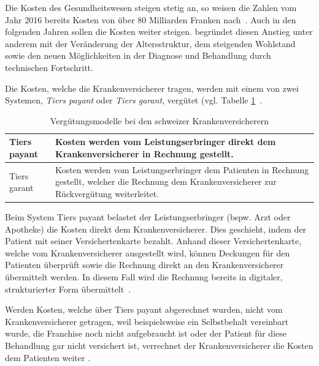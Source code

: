 Die Kosten des Gesundheitswesen steigen stetig an, so weisen die Zahlen vom Jahr 2016 bereits Kosten von über 80 Milliarden Franken nach~\autocite{BfS2018}. Auch in den folgenden Jahren sollen die Kosten weiter steigen. \textcite{Kirchgassner2009} begründet diesen Anstieg unter anderem mit der Veränderung der Altersstruktur, dem steigenden Wohlstand sowie den neuen Möglichkeiten in der Diagnose und Behandlung durch technischen Fortschritt.

Die Kosten, welche die Krankenversicherer tragen, werden mit einem von zwei Systemen, \textit{Tiers payant} oder \textit{Tiers garant}, vergütet (vgl. Tabelle \ref{tiers}~\autocite{EDI2017}. 

\begin{table}
    \renewcommand{\arraystretch}{1.25}
    \setlength{\tabcolsep}{10pt}
    \caption{Vergütungsmodelle bei den schweizer Krankenversicherern}
    \label{tiers}
    \begin{tabular}{| p{} | p{} |}
        \hline
         Tiers payant & Kosten werden vom Leistungserbringer direkt dem Krankenversicherer in Rechnung gestellt. \\
        \hline
         Tiers garant & Kosten werden vom Leistungserbringer dem Patienten in Rechnung gestellt, welcher die Rechnung dem Krankenversicherer zur Rückvergütung weiterleitet. \\
        \hline
    \end{tabular}
\end{table}

Beim System Tiers payant belastet der Leistungserbringer (bspw. Arzt oder Apotheke) die Kosten direkt dem Krankenversicherer. Dies geschieht, indem der Patient mit seiner Versichertenkarte bezahlt. Anhand dieser Versichertenkarte, welche vom Krankenversicherer ausgestellt wird, können Deckungen für den Patienten überprüft sowie die Rechnung direkt an den Krankenversicherer übermittelt werden. In diesem Fall wird die Rechnung bereits in digitaler, strukturierter Form übermittelt~\autocite{EDI2017}. 

Werden Kosten, welche über Tiers payant abgerechnet wurden, nicht vom Krankenversicherer getragen, weil beispielsweise ein Selbstbehalt vereinbart wurde, die Franchise noch nicht aufgebraucht ist oder der Patient für diese Behandlung gar nicht versichert ist, verrechnet der Krankenversicherer die Kosten dem Patienten weiter \autocite{EDI2017}.

